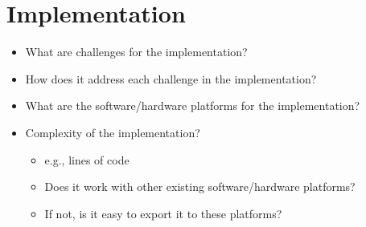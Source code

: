 \section{Implementation}
\begin{itemize}
\item
What are challenges for the implementation?
\item
How does it address each challenge in the implementation?
\item
What are the software/hardware platforms for the implementation?
\item
Complexity of the implementation?
\begin{itemize}
\item
e.g., lines of code
\item
Does it work with other existing software/hardware platforms?
\item
If not, is it easy to export it to these platforms?
\end{itemize}
\end{itemize}